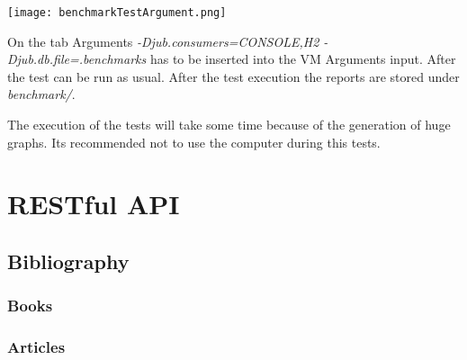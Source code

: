 \documentclass[11pt,fleqn,openany]{book} %
\begin{document}
\begin{center}
\texttt{[image: benchmarkTestArgument.png]} 
\end{center}

On the tab Arguments \textit{-Djub.consumers=CONSOLE,H2 -Djub.db.file=.benchmarks} has to be inserted into the VM Arguments input. After the test can be run as usual. After the test execution the reports are stored under \textit{benchmark/}.
 
\begin{remark}
The execution of the tests will take some time because of the generation of huge graphs. Its recommended not to use the computer during this tests.  
\end{remark}



\part{RESTful API}




\chapter*{Bibliography}
\section*{Books}
\printbibliography[heading=bibempty,type=book]
\section*{Articles}
\printbibliography[heading=bibempty,type=article]


\cleardoublepage
{}
\setlength{\columnsep}{0.75cm}
\printindex

\end{document}
